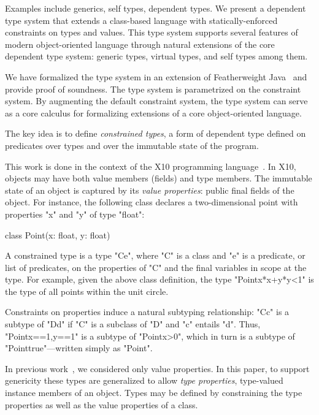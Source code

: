 \documentclass[preprint,nocopyrightspace,9pt]{sigplanconf}
\begin{document}
Examples include generics, self types, 
dependent types. 
We present a dependent type system
that extends a class-based language with
statically-enforced constraints on
types and values.
This type system 
supports several features of modern object-oriented 
language through natural extensions of the core dependent type
system: generic types, virtual types, and self types
among them.

We have formalized the type system in an extension of
Featherweight Java~\cite{FJ}
and provide proof of soundness.
The type system is parametrized on the constraint system.
By augmenting the default constraint system,
the type system can serve as a core calculus 
for formalizing extensions of a core object-oriented language. 

The key idea is to define
\emph{constrained types},
a form of dependent type
defined on predicates over types and over the immutable state of
the program.

This work is done in the context of the X10
programming language~\cite{X10}.
In X10, objects may have both value members (fields)
and type members.
The immutable state of an object is captured by its
\emph{value properties}: public final fields of the object.
For instance, the following class declares a two-dimensional
point with properties \xcd"x" and \xcd"y" of type \xcd"float":
\begin{xten}
class Point(x: float, y: float) { }
\end{xten}

A constrained type is a type \xcd"C{e}", where \xcd"C" is a
class and \xcd"e" is a predicate, or list of predicates, on the properties of
\xcd"C" and the final variables in scope at the type.
For example, given the above class definition,
the type \xcd"Point{x*x+y*y<1}" is the type of all
points within the unit circle.


Constraints on properties induce a natural subtyping relationship:
\xcd"C{c}" is a subtype of
\xcd"D{d}" if \xcd"C" is a subclass of \xcd"D" and
\xcd"c" entails \xcd"d".  Thus, \xcd"Point{x==1,y==1}"
is a subtype of \xcd"Point{x>0}", which in turn is a subtype of
\xcd"Point{true}"---written simply as \xcd"Point".

In previous
work~\cite{X10,constrained-types}, we considered
only value properties.
In this paper,
to support genericity these types are generalized
to allow \emph{type properties}, type-valued instance
members of an object.
Types may be defined by constraining the type properties as
well as the value properties of a class.
\end{document}
